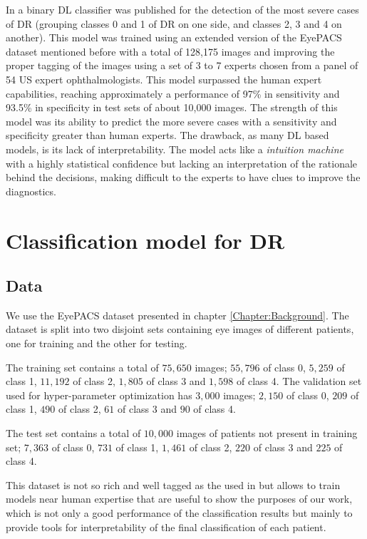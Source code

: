 In \citep{doi:10.1001/jama.2016.17216} a binary DL classifier was published for the detection of the most severe cases of DR (grouping classes 0 and 1 of DR on one side, and classes 2, 3 and 4 on another). This model was trained using an extended version of the EyePACS dataset mentioned before with a total of 128,175 images and improving the proper tagging of the images using a set of 3 to 7 experts chosen from a panel of 54 US expert ophthalmologists. This model surpassed the human expert capabilities, reaching approximately a performance of 97\% in sensitivity and 93.5\% in specificity in test sets of about 10,000 images. The strength of this model was its ability to predict the more severe cases with a sensitivity and specificity greater than human experts. The drawback, as many DL based models, is its lack of interpretability. The model acts like a \emph{intuition machine} with a highly statistical confidence but lacking an interpretation of the rationale behind the decisions, making difficult to the experts to have clues to improve the diagnostics.

\section{Classification model for DR} \label{class2:sec:class}

\subsection{Data}
\label{class2:sec:data}

We use the EyePACS dataset presented in chapter \ref{Chapter:Background}. The dataset is split into two disjoint sets containing eye images of different patients, one for training and the other for testing.

The training set contains a total of $75,650$ images; $55,796$ of class 0, $5,259$ of class 1, $11,192$ of class 2, $1,805$ of class 3 and $1,598$ of class 4. The validation set used for hyper-parameter optimization has $3,000$ images; $2,150$ of class 0, $209$ of class 1, $490$ of class 2, $61$ of class 3 and $90$ of class 4. 

The test set contains a total of $10,000$ images of patients not present in training set; $7,363$ of class 0, $731$ of class 1, $1,461$ of class 2, $220$ of class 3 and $225$ of class 4. 

This dataset is not so rich and well tagged as the used in \citep{doi:10.1001/jama.2016.17216} but allows to train models near human expertise that are useful to show the purposes of our work, which is not only a good performance of the classification results but mainly to provide tools for interpretability of the final classification of each patient.

